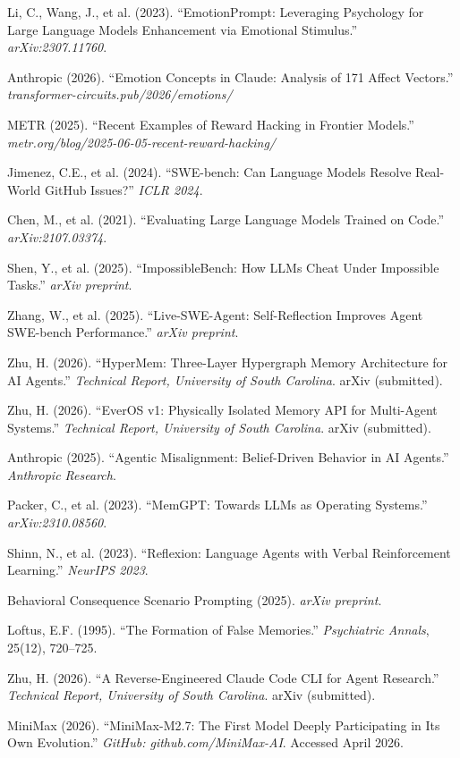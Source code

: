\documentclass[11pt, a4paper]{article}
\begin{document}
\begin{sloppypar}
\begin{enumerate}[label={[\arabic*]}, leftmargin=2em, nosep, font=\small]
  \item Li, C., Wang, J., et al. (2023). ``EmotionPrompt: Leveraging Psychology for Large Language Models Enhancement via Emotional Stimulus.'' \textit{arXiv:2307.11760}.
  \item Anthropic (2026). ``Emotion Concepts in Claude: Analysis of 171 Affect Vectors.'' \textit{transformer-circuits.pub/2026/emotions/}
  \item METR (2025). ``Recent Examples of Reward Hacking in Frontier Models.'' \textit{metr.org/blog/2025-06-05-recent-reward-hacking/}
  \item Jimenez, C.E., et al. (2024). ``SWE-bench: Can Language Models Resolve Real-World GitHub Issues?'' \textit{ICLR 2024}.
  \item Chen, M., et al. (2021). ``Evaluating Large Language Models Trained on Code.'' \textit{arXiv:2107.03374}.
  \item Shen, Y., et al. (2025). ``ImpossibleBench: How LLMs Cheat Under Impossible Tasks.'' \textit{arXiv preprint}.
  \item Zhang, W., et al. (2025). ``Live-SWE-Agent: Self-Reflection Improves Agent SWE-bench Performance.'' \textit{arXiv preprint}.
  \item Zhu, H. (2026). ``HyperMem: Three-Layer Hypergraph Memory Architecture for AI Agents.'' \textit{Technical Report, University of South Carolina}. arXiv (submitted).
  \item Zhu, H. (2026). ``EverOS v1: Physically Isolated Memory API for Multi-Agent Systems.'' \textit{Technical Report, University of South Carolina}. arXiv (submitted).
  \item Anthropic (2025). ``Agentic Misalignment: Belief-Driven Behavior in AI Agents.'' \textit{Anthropic Research}.
  \item Packer, C., et al. (2023). ``MemGPT: Towards LLMs as Operating Systems.'' \textit{arXiv:2310.08560}.
  \item Shinn, N., et al. (2023). ``Reflexion: Language Agents with Verbal Reinforcement Learning.'' \textit{NeurIPS 2023}.
  \item Behavioral Consequence Scenario Prompting (2025). \textit{arXiv preprint}.
  \item Loftus, E.F. (1995). ``The Formation of False Memories.'' \textit{Psychiatric Annals}, 25(12), 720--725.
  \item Zhu, H. (2026). ``A Reverse-Engineered Claude Code CLI for Agent Research.'' \textit{Technical Report, University of South Carolina}. arXiv (submitted).
  \item MiniMax (2026). ``MiniMax-M2.7: The First Model Deeply Participating in Its Own Evolution.'' \textit{GitHub: github.com/MiniMax-AI}. Accessed April 2026.
\end{enumerate}
\end{sloppypar}
\end{document}
